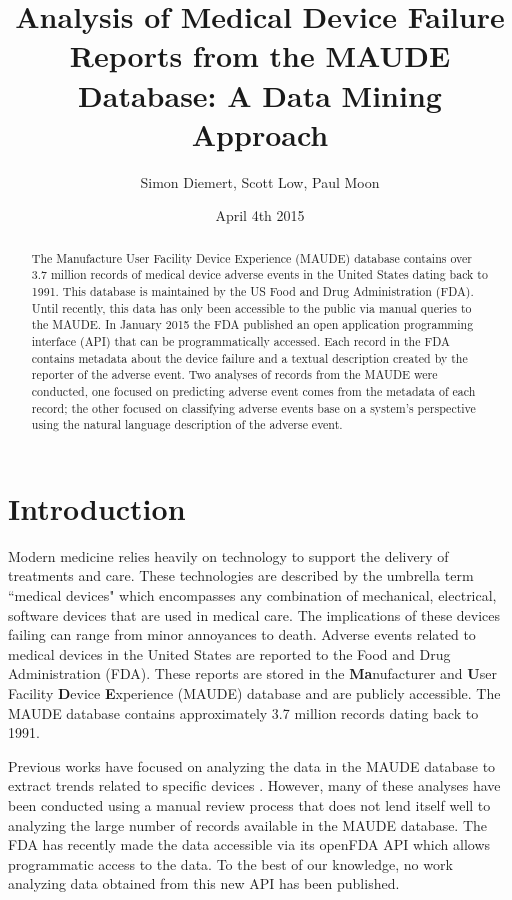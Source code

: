 \documentclass[11pt, notitlepage,abstracton,oneside]{article}   	%
\title{Analysis of Medical Device Failure Reports from the MAUDE Database: A Data Mining Approach}
\author{Simon Diemert, Scott Low, Paul Moon}
\date{April 4th 2015}							%
\begin{document}
\maketitle

\begin{abstract}


\thispagestyle{empty}
The Manufacture User Facility Device Experience (MAUDE) database contains over 3.7 million records of medical device adverse events in the United States dating back to 1991. This database is maintained by the US Food and Drug Administration (FDA). Until recently, this data has only been accessible to the public via manual queries to the MAUDE. In January 2015 the FDA published an open application programming interface (API) that can be programmatically accessed. Each record in the FDA contains metadata about the device failure and a textual description created by the reporter of the adverse event. Two analyses of records from the MAUDE were conducted, one focused on predicting adverse event comes from the metadata of each record; the other focused on classifying adverse events base on a system's perspective using the natural language description of the adverse event. %
\end{abstract}

\tableofcontents

\clearpage
\newpage
\setcounter{page}{1}
\section{Introduction}
Modern medicine relies heavily on technology to support the delivery of treatments and care. These technologies are described by the umbrella term ``medical devices" which encompasses any combination of mechanical, electrical, software devices that are used in medical care. The implications of these devices failing can range from minor annoyances to death. Adverse events related to medical devices in the United States are reported to the Food and Drug Administration (FDA). These reports are stored in the \textbf{Ma}nufacturer and \textbf{U}ser Facility \textbf{D}evice \textbf{E}xperience (MAUDE) database and are publicly accessible. The MAUDE database contains approximately 3.7 million records dating back to 1991. 

Previous works have focused on analyzing the data in the MAUDE database to extract trends related to specific devices \cite{weber_preliminary_2011}. However, many of these analyses have been conducted using a manual review process that does not lend itself well to analyzing the large number of records available in the MAUDE database. The FDA has recently made the data accessible via its openFDA API which allows programmatic access to the data. To the best of our knowledge, no work analyzing data obtained from this new API has been published.
\end{document}

